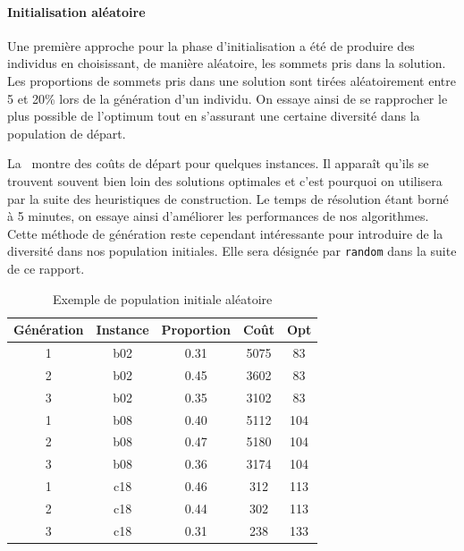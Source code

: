 \documentclass[10pt]{article}
\begin{document}
		\paragraph{Initialisation aléatoire}{
			Une première approche pour la phase d'initialisation a été de produire des individus en choisissant, de manière aléatoire, les sommets pris dans la solution. Les proportions de sommets pris dans une solution sont tirées aléatoirement entre 5 et 20\% lors de la génération d'un individu. On essaye ainsi de se rapprocher le plus possible de l'optimum tout en s'assurant une certaine diversité dans la population de départ.
			
			La~ montre des coûts de départ pour quelques instances. Il apparaît qu'ils se trouvent souvent bien loin des solutions optimales et c'est pourquoi on utilisera par la suite des heuristiques de construction. Le temps de résolution étant borné à 5 minutes, on essaye ainsi d'améliorer les performances de nos algorithmes. Cette méthode de génération reste cependant intéressante pour introduire de la diversité dans nos population initiales. Elle sera désignée par \texttt{random} dans la suite de ce rapport.
			
			\begin{table}[h!]
				\centering
				\begin{tabular}{|c|c|c|c|c|}
					\hline
					\textbf{Génération} & \textbf{Instance} & \textbf{Proportion} & \textbf{Coût} & \textbf{Opt} \\
					\hline
					1&b02  & 0.31 & 5075 & 83 \\
					2&b02  & 0.45 & 3602 & 83 \\
					3&b02  & 0.35 & 3102 & 83 \\
					1&b08  & 0.40 & 5112 & 104 \\
					2&b08  & 0.47 & 5180 & 104 \\
					3&b08  & 0.36 & 3174 & 104 \\
					1&c18  & 0.46 & 312 & 113 \\
					2&c18  & 0.44 & 302 & 113 \\
					3&c18  & 0.31 & 238 & 133 \\
					\hline
				\end{tabular}
				\caption{Exemple de population initiale aléatoire}
				\label{tab-randominit}
			\end{table}
			}
\end{document}
